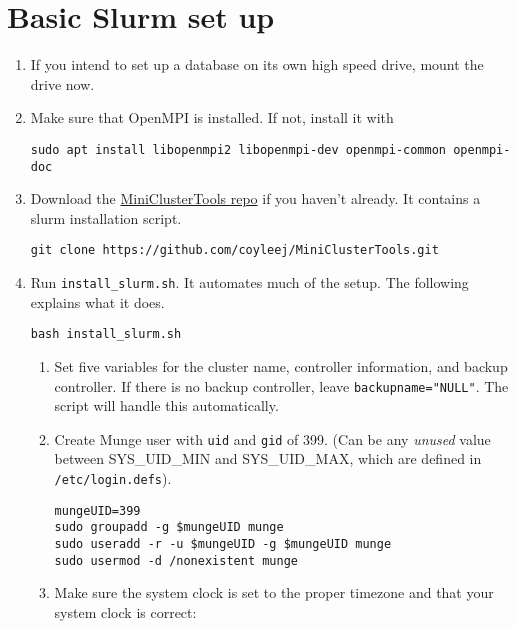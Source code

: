 \section{Basic Slurm set up} \label{sec:basicslurm}

\begin{enumerate}
\item If you intend to set up a database on its own high speed drive, mount the drive now. %

\item Make sure that OpenMPI is installed. If not, install it with

	\texttt{sudo apt install libopenmpi2 libopenmpi-dev openmpi-common openmpi-doc}

\item Download the \href{https://github.com/coyleej/MiniClusterTools}{MiniClusterTools repo}  if you haven't already. It contains a slurm installation script.

	\texttt{git clone https://github.com/coyleej/MiniClusterTools.git}

\item Run \texttt{install\_slurm.sh}. It automates much of the setup. The following explains what it does.

	\texttt{bash install\_slurm.sh}

	\begin{enumerate}
	\item Set five variables for the cluster name, controller information, and backup controller. If there is no backup controller, leave \texttt{backupname="NULL"}. The script will handle this automatically.

	\item Create Munge user with \texttt{uid} and \texttt{gid} of 399. (Can be any \emph{unused} value between SYS\_UID\_MIN and SYS\_UID\_MAX, which are defined in \texttt{/etc/login.defs}). 

		\texttt{mungeUID=399} \\
		\texttt{sudo groupadd -g \$mungeUID munge} \\
		\texttt{sudo useradd -r -u \$mungeUID -g \$mungeUID munge} \\
		\texttt{sudo usermod -d /nonexistent munge}

	\item Make sure the system clock is set to the proper timezone and that your system clock is correct:


\end{enumerate}
\end{enumerate}
